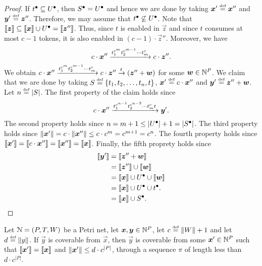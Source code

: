 \begin{proof}
  If ${t^\bullet} \subseteq {U^\bullet}$, then ${S^\bullet} = {U^\bullet}$ and
  hence we are done by taking $\bm{x}' \stackrel{\scriptscriptstyle\text{def}}{=} \bm{x}''$ and
  $\bm{y}' \stackrel{\scriptscriptstyle\text{def}}{=} \bm{z}''$. Therefore, we may assume that ${t^\bullet}
  \not\subseteq {U^\bullet}$. Note that $\llbracket\bm{z}\rrbracket \subseteq
  \llbracket\bm{x}\rrbracket \cup {U^\bullet} = \llbracket\bm{z}''\rrbracket$. Thus, since $t$ is
  enabled in $\vec{z}$ and since $t$ consumes at most $c - 1$ tokens,
  it is also enabled in $(c - 1) \cdot \vec{z}''$. Moreover, we
  have $$c \cdot \bm{x}'' \xrightarrow{t_1^{c^m} t_2^{c^{m-1}} \cdots
    t_m^c} c \cdot \bm{z}''.$$ We obtain $c \cdot \bm{x}''
  \xrightarrow{t_1^{c^m} t_2^{c^{m-1}} \cdots t_m^c} c \cdot \bm{z}''
  \xrightarrow{t} (\bm{z}'' + \bm{w})$ for some $\bm{w} \in \mathbb{N}^P$.  We
  claim that we are done by taking $S \stackrel{\scriptscriptstyle\text{def}}{=} \{t_1, t_2, \ldots, t_n,
  t\}$, $\bm{x}' \stackrel{\scriptscriptstyle\text{def}}{=} c \cdot \bm{x}''$ and $\bm{y}' \stackrel{\scriptscriptstyle\text{def}}{=}
  \bm{z}'' + \bm{w}$. Let $n \stackrel{\scriptscriptstyle\text{def}}{=} |S|$. The first property of
  the claim holds since
  $$c \cdot \bm{x}'' \xrightarrow{t_1^{c^{n-1}} t_2^{c^{n-2}} \cdots t_m^c
    t} \bm{y}'.$$ The second property holds since $n = m + 1 \leq
  |{U^\bullet}| + 1 = |{S^\bullet}|$. The third property holds since
  $\lVert\bm{x}'\rVert = c \cdot \lVert\bm{x}''\rVert \leq c \cdot c^m =
  c^{m+1} = c^n$. The fourth property holds since $\llbracket\bm{x}'\rrbracket =
  \llbracket c \cdot \bm{x}''\rrbracket = \llbracket\bm{x}''\rrbracket =
  \llbracket\bm{x}\rrbracket$. Finally, the fifth proprety holds since
  \begin{align*}
    \llbracket\bm{y}'\rrbracket
    &= \llbracket\bm{z}'' + \bm{w}\rrbracket \\
    &= \llbracket\bm{z}''\rrbracket \cup \llbracket\bm{w}\rrbracket \\
    &= \llbracket\bm{x}\rrbracket \cup {U^\bullet} \cup \llbracket\bm{w}\rrbracket \\ 
    &= \llbracket\bm{x}\rrbracket \cup {U^\bullet} \cup {t^\bullet}. \\ 
    &= \llbracket\bm{x}\rrbracket \cup {S^\bullet}.\qedhere
  \end{align*}
\end{proof}

\begin{corollary}\label{prop:short:cover}
  Let $\mathcal{N} = (P, T, W)$ be a Petri net, let $\bm{x}, \bm{y} \in
  \mathbb{N}^P$, let $c \stackrel{\scriptscriptstyle\text{def}}{=} \lVert W\rVert + 1$ and let $d \stackrel{\scriptscriptstyle\text{def}}{=} \lVert y\rVert$. If
  $\vec{y}$ is coverable from $\vec{x}$, then $\vec{y}$ is coverable
  from some $\bm{x}' \in \mathbb{N}^P$ such that $\llbracket\bm{x}'\rrbracket =
  \llbracket\bm{x}\rrbracket$ and $\lVert\bm{x}'\rVert \leq d \cdot c^{|P|}$, through
  a sequence $\pi$ of length less than $d \cdot c^{|P|}$.
\end{corollary}

